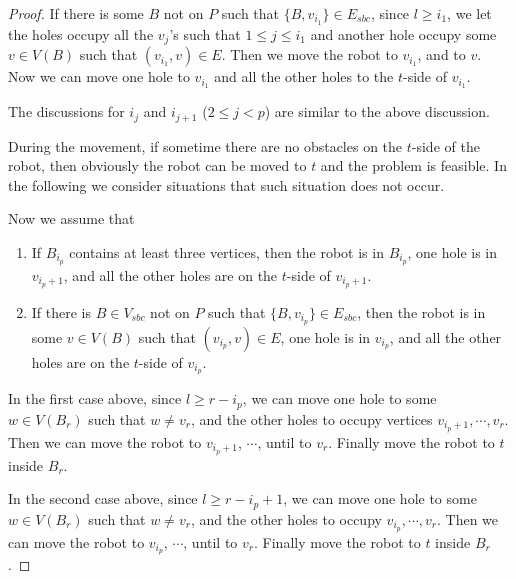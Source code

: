 \documentclass{article}
\begin{document}
\begin{proof}
If there is some $B$ not on $P$ such that $\{B, v_{i_1}\} \in
E_{sbc}$, since $l \ge i_1$, we let the holes occupy all the $v_j$'s
such that $1 \le j \le i_1$ and another hole occupy some $v \in
V(B)$ such that $(v_{i_1},v) \in E$. Then we move the robot to
$v_{i_1}$, and to $v$. Now we can move one hole to $v_{i_1}$ and all
the other holes to the $t$-side of $v_{i_1}$.

The discussions for $i_j$ and $i_{j+1}$ ($2 \le j < p$) are similar
to the above discussion.

During the movement, if sometime there are no obstacles on the
$t$-side of the robot, then obviously the robot can be moved to $t$
and the problem is feasible. In the following we consider situations
that such situation does not occur.

Now we assume that
\begin{enumerate}
\item If $B_{i_{p}}$ contains at least three vertices, then the robot is in $B_{i_{p}}$, one hole
is in $v_{i_p+1}$, and all the other holes are on the $t$-side of
$v_{i_p+1}$.

\item If there is $B \in V_{sbc}$ not on $P$ such that
$\{B,v_{i_p}\}
\in E_{sbc}$, then the robot is in some $v \in V(B)$ such that
$\left(v_{i_p},v\right) \in E$, one hole is in $v_{i_p}$, and all
the other holes are on the $t$-side of $v_{i_p}$.
\end{enumerate}

In the first case above, since $l \ge r-i_p$, we can move one hole
to some $w \in V(B_r)$ such that $w \ne v_r$, and the other holes to
occupy vertices $v_{i_p+1},\cdots, v_r$. Then we can move the robot
to $v_{i_p+1}$, $\cdots$, until to $v_r$. Finally move the robot to
$t$ inside $B_r$.

In the second case above, since $l \ge r-{i_p}+1$, we can move one
hole to some $w \in V(B_r)$ such that $w \ne v_r$, and the other
holes to occupy $v_{i_p},\cdots, v_r$. Then we can move the robot to
$v_{i_p}$, $\cdots$, until to $v_r$. Finally move the robot to $t$
inside $B_r$.

\end{proof}
\end{document}
